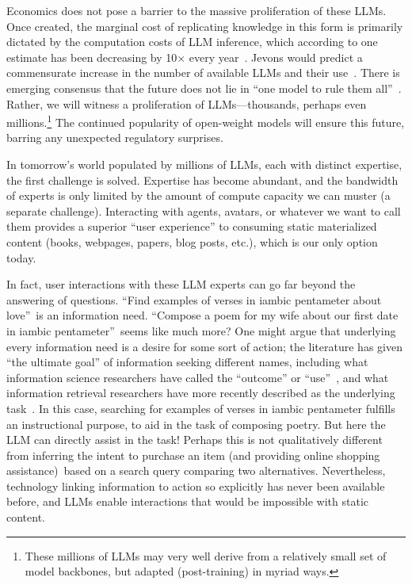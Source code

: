 \documentclass{article}
\begin{document}
Economics does not pose a barrier to the massive proliferation of these LLMs.
Once created, the marginal cost of replicating knowledge in this form is primarily dictated by the computation costs of LLM inference, which according to one estimate has been decreasing by 10$\times$ every year~\citep{cost}.
Jevons would predict a commensurate increase in the number of available LLMs and their use~\citep{jevons}.
There is emerging consensus that the future does not lie in ``one model to rule them all''~\citep{one-model}.
Rather, we will witness a proliferation of LLMs---thousands, perhaps even millions.\footnote{These millions of LLMs may very well derive from a relatively small set of model backbones, but adapted (post-training) in myriad ways.}
The continued popularity of open-weight models will ensure this future, barring any unexpected regulatory surprises.

In tomorrow's world populated by millions of LLMs, each with distinct expertise, the first challenge is solved.
Expertise has become abundant, and the bandwidth of experts is only limited by the amount of compute capacity we can muster (a separate challenge).
Interacting with agents, avatars, or whatever we want to call them provides a superior ``user experience'' to consuming static materialized content (books, webpages, papers, blog posts, etc.), which is our only option today.

In fact, user interactions with these LLM experts can go far beyond the answering of questions.
``Find examples of verses in iambic pentameter about love''\ is an information need.
``Compose a poem for my wife about our first date in iambic pentameter''\ seems like much more?
One might argue that underlying every information need is a desire for some sort of action; the literature has given ``the ultimate goal'' of information seeking different names, including what information science researchers have called the ``outcome'' or ``use''~\citep{Wilson99}, and what information retrieval researchers have more recently described as the underlying task~\citep{ShahChirag_etal_CHIIR2023}.
In this case, searching for examples of verses in iambic pentameter fulfills an instructional purpose, to aid in the task of composing poetry.
But here the LLM can directly assist in the task!
Perhaps this is not qualitatively different from inferring the intent to purchase an item (and providing online shopping assistance)\ based on a search query comparing two alternatives.
Nevertheless, technology linking information to action so explicitly has never been available before, and LLMs enable interactions that would be impossible with static content.
\end{document}

